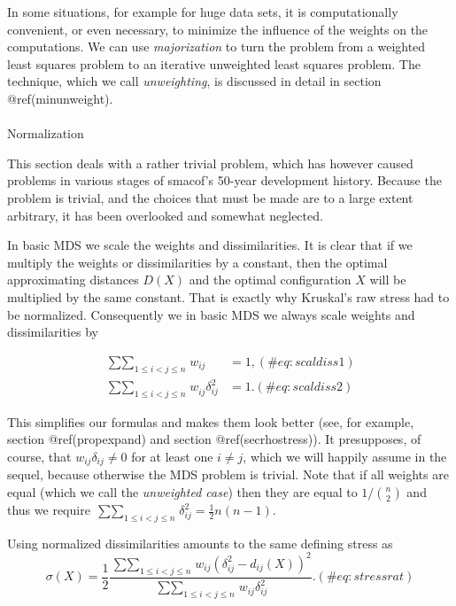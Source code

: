 \documentclass[
  12pt,
  letterpaper,
  DIV=11,
  numbers=noendperiod]{scrartcl}
\makeatletter
\let\oldparagraph\paragraph
\renewcommand{\paragraph}{
    \@ifstar
      \xxxParagraphStar
      \xxxParagraphNoStar
  }
\newcommand{\xxxParagraphStar}[1]{\oldparagraph*{#1}\mbox{}}
\newcommand{\xxxParagraphNoStar}[1]{\oldparagraph{#1}\mbox{}}
\makeatother
\begin{document}
In some situations, for example for huge data sets, it is
computationally convenient, or even necessary, to minimize the influence
of the weights on the computations. We can use \emph{majorization} to
turn the problem from a weighted least squares problem to an iterative
unweighted least squares problem. The technique, which we call
\emph{unweighting}, is discussed in detail in section @ref(minunweight).

\paragraph{Normalization}\label{intronorm}

This section deals with a rather trivial problem, which has however
caused problems in various stages of smacof's 50-year development
history. Because the problem is trivial, and the choices that must be
made are to a large extent arbitrary, it has been overlooked and
somewhat neglected.

In basic MDS we scale the weights and dissimilarities. It is clear that
if we multiply the weights or dissimilarities by a constant, then the
optimal approximating distances \(D(X)\) and the optimal configuration
\(X\) will be multiplied by the same constant. That is exactly why
Kruskal's raw stress had to be normalized. Consequently we in basic MDS
we always scale weights and dissimilarities by

\begin{align}
\mathop{\sum\sum}_{1\leq i<j\leq n}w_{ij}&=1,(\#eq:scaldiss1)\\
\mathop{\sum\sum}_{1\leq i<j\leq n}w_{ij}^{\ }\delta_{ij}^2&=1.(\#eq:scaldiss2)
\end{align}

This simplifies our formulas and makes them look better (see, for
example, section @ref(propexpand) and section @ref(secrhostress)). It
presupposes, of course, that \(w_{ij}\delta_{ij}\not=0\) for at least
one \(i\not= j\), which we will happily assume in the sequel, because
otherwise the MDS problem is trivial. Note that if all weights are equal
(which we call the \emph{unweighted case}) then they are equal to
\(1/\binom{n}{2}\) and thus we require
\(\mathop{\sum\sum}_{1\leq i<j\leq n}\delta_{ij}^2=\frac12n(n-1)\).

Using normalized dissimilarities amounts to the same defining stress as
\begin{equation}
\sigma(X)=\frac12\frac{\mathop{\sum\sum}_{1\leq i<j\leq n}w_{ij}(\delta_{ij}^2-d_{ij}(X))^2}{\mathop{\sum\sum}_{1\leq i<j\leq n}w_{ij}\delta_{ij}^2}.
(\#eq:stressrat)
\end{equation}
\end{document}
